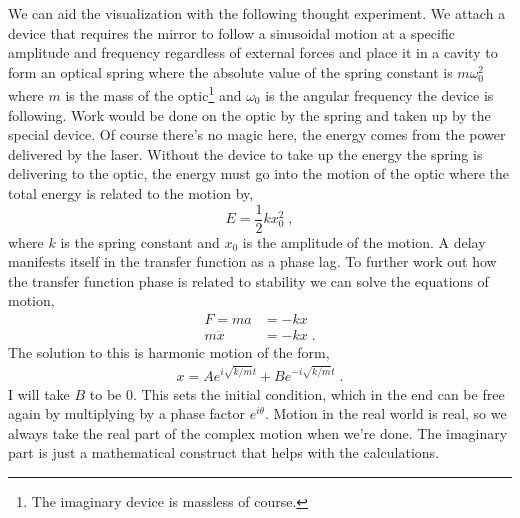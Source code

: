 We can aid the visualization with the following thought experiment.
We attach a device that requires the mirror to follow a
sinusoidal motion at a specific amplitude and frequency regardless of external
forces and place it in a cavity to form an optical spring where the absolute
value of the spring constant is $m\omega_0^2$ where $m$ is the mass of the
optic\footnote{The imaginary device is massless of course.} and $\omega_0$
is the angular frequency the device is following.
Work would be done on the optic by the spring and taken up by the special device.
Of course there's no magic here, the energy comes from the power delivered by
the laser.
Without the device to take up the energy the spring is delivering to
the optic, the energy must go into the motion of the optic where the total
energy is related to the motion by,
\begin{equation}
E = \frac{1}{2}kx_0^2 \;,
\end{equation}
where $k$ is the spring constant and $x_0$ is the amplitude of the motion.
A delay manifests itself in the transfer function as a phase lag.
To further work out how the transfer function phase is related to stability
we can solve the equations of motion,
\begin{align*}
F = ma &= -kx \\
  m\ddot x &= -kx\;.
\end{align*}
The solution to this is harmonic motion of the form,
\begin{align*}
x = Ae^{i\sqrt{k/m}t} + Be^{-i\sqrt{k/m}t} \;.
\end{align*}
I will take $B$ to be $0$. This sets the initial condition, which in the
end can be free again by multiplying by a phase factor $e^{i\theta}$.
Motion in the real world is real, so we always take the real part of the
complex motion when we're done. The imaginary part is just a mathematical
construct that helps with the calculations.


